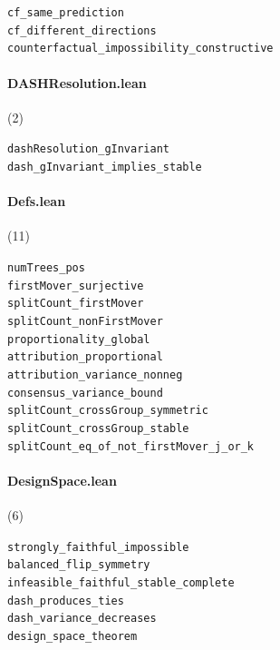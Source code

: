 {\footnotesize
\texttt{cf\_same\_prediction}\\
\texttt{cf\_different\_directions}\\
\texttt{counterfactual\_impossibility\_constructive}\\
}

\paragraph{DASHResolution.lean} (2)

{\footnotesize
\texttt{dashResolution\_gInvariant}\\
\texttt{dash\_gInvariant\_implies\_stable}\\
}

\paragraph{Defs.lean} (11)

{\footnotesize
\texttt{numTrees\_pos}\\
\texttt{firstMover\_surjective}\\
\texttt{splitCount\_firstMover}\\
\texttt{splitCount\_nonFirstMover}\\
\texttt{proportionality\_global}\\
\texttt{attribution\_proportional}\\
\texttt{attribution\_variance\_nonneg}\\
\texttt{consensus\_variance\_bound}\\
\texttt{splitCount\_crossGroup\_symmetric}\\
\texttt{splitCount\_crossGroup\_stable}\\
\texttt{splitCount\_eq\_of\_not\_firstMover\_j\_or\_k}\\
}

\paragraph{DesignSpace.lean} (6)

{\footnotesize
\texttt{strongly\_faithful\_impossible}\\
\texttt{balanced\_flip\_symmetry}\\
\texttt{infeasible\_faithful\_stable\_complete}\\
\texttt{dash\_produces\_ties}\\
\texttt{dash\_variance\_decreases}\\
\texttt{design\_space\_theorem}\\
}

